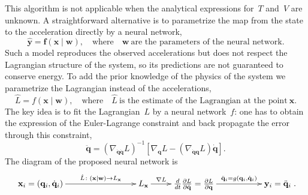 \documentclass[sn-mathphys-num]{sn-jnl}
\theoremstyle{thmstylethree}
\theoremstyle{thmstyletwo}
\theoremstyle{thmstyleone}
\begin{document}
This algorithm is not applicable when the analytical expressions for~$T$ and~$V$ are unknown. A straightforward alternative is to parametrize the map from the state to the acceleration directly by a neural network,
\begin{equation}
\hat{\mathbf{y}}  = \mathbf{f}(\mathbf{x} \mid \mathbf{w}),
\quad
\text{where}
\quad
\mathbf{w}~\text{are the parameters of the neural network.}
\label{eq:model_direct}
\end{equation}
Such a model reproduces the observed accelerations but does not respect the Lagrangian structure of the system, so its predictions are not guaranteed to conserve energy. To add the prior knowledge of the physics of the system we parametrize the Lagrangian instead of the accelerations,
\begin{equation}
\hat{L}  = f(\mathbf{x} \mid \mathbf{w}),
\quad
\text{where}
\quad
\hat{L}~\text{is the estimate of the Lagrangian at the point}~\mathbf{x}.
\label{eq:model}
\end{equation}
The key idea is to fit the Lagrangian~$L$ by a neural network~$f$: one has to obtain the expression of the Euler-Lagrange constraint and back propagate the error through this constraint,
\begin{equation}
\ddot{\mathbf{q}} =\left(\nabla_{\dot{\mathbf{q}} \dot{\mathbf{q}}} L\right)^{-1}\left[\nabla_{\mathbf{q}} L-\left(\nabla_{\dot{\mathbf{q}}\mathbf{q}} L\right) \dot{\mathbf{q}}\right].
\label{eq:euler_larange_to_acc}
\end{equation}
The diagram of the proposed neural network is
\begin{equation}
    \xymatrix{
    \mathbf{x}_i = (\mathbf{q}_i, \dot{\mathbf{q}}_i) \ar@{->}[rrr]^-{\hat{L} \colon (\mathbf{x} | \mathbf{w}) \to L_\mathbf{x}} & & & L_\mathbf{x} \ar@{->}[r]^-{\nabla L} & \frac{d}{d t} \frac{\partial L}{\partial \dot{\mathbf{q}}} =\frac{\partial L}{\partial \mathbf{q}} \ar@{->}[rr]^-{{\ddot{\mathbf{q}}_i = g\left(\mathbf{q}_i, \dot{\mathbf{q}}_i\right)}} &  & \mathbf{y}_i = \ddot{\mathbf{q}}_i
    }.
\label{fig: LNN}
\end{equation}
\end{document}
